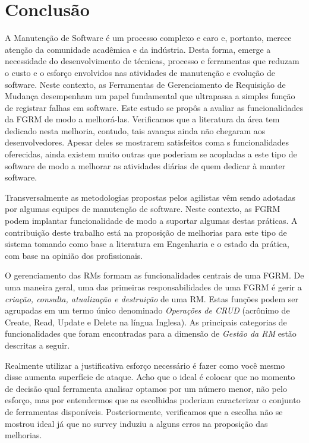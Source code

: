 \chapter{Conclusão}
\label{ch:conclusao_trab_futuros}

A Manutenção de Software é um processo complexo e caro e, portanto,  merece
atenção da comunidade acadêmica e da indústria. Desta forma, emerge a
necessidade do desenvolvimento de técnicas, processo e ferramentas que reduzam o
custo e o esforço envolvidos nas atividades de manutenção e evolução de
software. Neste contexto, as Ferramentas de Gerenciamento de Requisição de
Mudança desempenham um papel fundamental que ultrapassa a simples função de
registrar falhas em software. Este estudo se propôs a avaliar as funcionalidades
da FGRM de modo a melhorá-las. Verificamos que a literatura da área tem dedicado
nesta melhoria, contudo, tais avanças ainda não chegaram aos desenvolvedores.
Apesar deles se mostrarem satisfeitos coma s funcionalidades oferecidas, ainda
existem muito outras que poderiam se acopladas a este tipo de software de modo a
melhorar as atividades diárias de quem dedicar à manter software.

Transversalmente as metodologias propostas pelos agilistas vêm sendo adotadas
por algumas equipes de manutenção de software. Neste contexto, as FGRM podem
implantar funcionalidade de modo a suportar algumas destas práticas. A
contribuição deste trabalho está na proposição de melhorias para este tipo de
sistema tomando como base a literatura em Engenharia e o estado da prática, com
base na opinião dos profissionais.

O gerenciamento das RMs formam as funcionalidades centrais de uma FGRM\@. De uma
maneira geral, uma das primeiras responsabilidades de uma FGRM é gerir a
\textit{criação, consulta, atualização e destruição} de uma RM\@. Estas funções
podem ser agrupadas em um termo único denominado \textit{Operações de CRUD}
(acrônimo de Create, Read, Update e Delete na língua Inglesa). As principais
categorias de funcionalidades que foram encontradas para a dimensão de
\textit{Gestão da RM} estão descritas a seguir.

Realmente utilizar a justificativa esforço necessário é fazer como você mesmo
disse aumenta superfície de ataque. Acho que o ideal é colocar que no momento
de decisão qual ferramenta analisar optamos por um número menor, não pelo
esforço, mas por entendermos que as escolhidas poderiam caracterizar o conjunto
de ferramentas disponíveis. Posteriormente, verificamos que a escolha não se
mostrou ideal já que no survey induziu a alguns erros na proposição das
melhorias.
